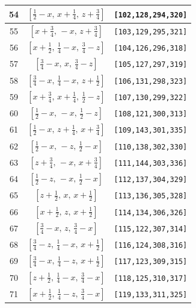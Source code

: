 \documentclass[fleqn,8pt]{jsarticle}
\begin{document}
\begin{longtable}{ccc}
54 & $\left[ \frac{1}{2} - x,\, x + \frac{1}{4},\, z + \frac{3}{4} \right]$ & {\tt [102,128,294,320]} \\ \hline
55 & $\left[ x + \frac{3}{4},\, - x,\, z + \frac{3}{4} \right]$ & {\tt [103,129,295,321]} \\ \hline
56 & $\left[ x + \frac{1}{2},\, \frac{1}{4} - x,\, \frac{3}{4} - z \right]$ & {\tt [104,126,296,318]} \\ \hline
57 & $\left[ \frac{3}{4} - x,\, x,\, \frac{3}{4} - z \right]$ & {\tt [105,127,297,319]} \\ \hline
58 & $\left[ \frac{3}{4} - x,\, \frac{1}{4} - x,\, z + \frac{1}{2} \right]$ & {\tt [106,131,298,323]} \\ \hline
59 & $\left[ x + \frac{3}{4},\, x + \frac{1}{4},\, \frac{1}{2} - z \right]$ & {\tt [107,130,299,322]} \\ \hline
60 & $\left[ \frac{1}{2} - x,\, - x,\, \frac{1}{2} - z \right]$ & {\tt [108,121,300,313]} \\ \hline
61 & $\left[ \frac{1}{2} - x,\, z + \frac{1}{4},\, x + \frac{3}{4} \right]$ & {\tt [109,143,301,335]} \\ \hline
62 & $\left[ \frac{1}{2} - x,\, - z,\, \frac{1}{2} - x \right]$ & {\tt [110,138,302,330]} \\ \hline
63 & $\left[ z + \frac{3}{4},\, - x,\, x + \frac{3}{4} \right]$ & {\tt [111,144,303,336]} \\ \hline
64 & $\left[ \frac{1}{2} - z,\, - x,\, \frac{1}{2} - x \right]$ & {\tt [112,137,304,329]} \\ \hline
65 & $\left[ z + \frac{1}{2},\, x,\, x + \frac{1}{2} \right]$ & {\tt [113,136,305,328]} \\ \hline
66 & $\left[ x + \frac{1}{2},\, z,\, x + \frac{1}{2} \right]$ & {\tt [114,134,306,326]} \\ \hline
67 & $\left[ \frac{3}{4} - x,\, z,\, \frac{3}{4} - x \right]$ & {\tt [115,122,307,314]} \\ \hline
68 & $\left[ \frac{3}{4} - z,\, \frac{1}{4} - x,\, x + \frac{1}{2} \right]$ & {\tt [116,124,308,316]} \\ \hline
69 & $\left[ \frac{3}{4} - x,\, \frac{1}{4} - z,\, x + \frac{1}{2} \right]$ & {\tt [117,123,309,315]} \\ \hline
70 & $\left[ z + \frac{1}{2},\, \frac{1}{4} - x,\, \frac{3}{4} - x \right]$ & {\tt [118,125,310,317]} \\ \hline
71 & $\left[ x + \frac{1}{2},\, \frac{1}{4} - z,\, \frac{3}{4} - x \right]$ & {\tt [119,133,311,325]} \\ \hline

\end{longtable}
\end{document}
